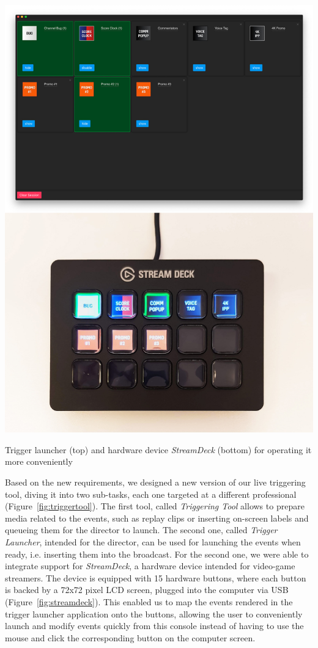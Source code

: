 \documentclass[sigchi-a, authorversion]{acmart}
\begin{document}
\begin{marginfigure}
    \includegraphics[width=\marginparwidth-10pt]{Figures/streamdeck.jpg}
    \caption{Trigger launcher (top) and hardware device \emph{StreamDeck} (bottom) for operating it more conveniently}
    \label{fig:streamdeck}
\end{marginfigure}

Based on the new requirements, we designed a new version of our live triggering
tool, diving it into two sub-tasks, each one targeted at a different professional
(Figure~\ref{fig:triggertool}). The first tool, called \emph{Triggering Tool} allows to prepare media
related to the events, such as replay clips or inserting on-screen labels and queueing
them for the director to launch. The second one, called \emph{Trigger Launcher}, intended for the director, can
be used for launching the events when ready, i.e. inserting them into the broadcast.
For the second one, we were able to integrate support for \emph{StreamDeck}, a 
hardware device intended for video-game streamers. The device is equipped with 15
hardware buttons, where each button is backed by a 72x72 pixel LCD screen, plugged into the computer via USB
(Figure~\ref{fig:streamdeck}). This enabled us to map the events rendered in the
trigger launcher application onto the buttons, allowing the user to conveniently launch and
modify events quickly from this console instead of having to use the mouse and
click the corresponding button on the computer screen.
\end{document}
